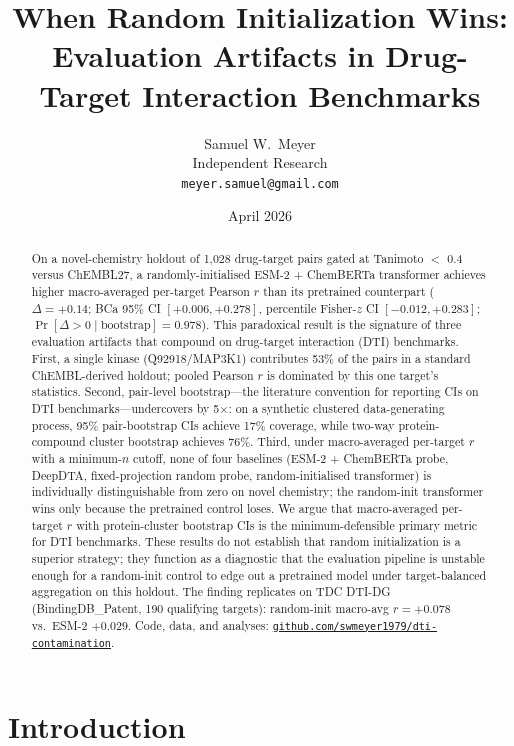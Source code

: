 \documentclass[11pt,a4paper]{article}
\title{\textbf{When Random Initialization Wins:\\
Evaluation Artifacts in Drug-Target Interaction Benchmarks}}
\author{
  Samuel W.\ Meyer\\
  Independent Research\\
  \texttt{meyer.samuel@gmail.com}
}
\date{April 2026}
\begin{document}
\maketitle

\begin{abstract}
On a novel-chemistry holdout of 1{,}028 drug-target pairs gated at Tanimoto $<$ 0.4
versus ChEMBL27, a randomly-initialised ESM-2 + ChemBERTa transformer achieves
higher macro-averaged per-target Pearson $r$ than its pretrained counterpart
($\Delta = +0.14$; BCa 95\% CI $[+0.006, +0.278]$, percentile Fisher-$z$
CI $[-0.012, +0.283]$;
$\Pr[\Delta > 0 \mid \text{bootstrap}] = 0.978$).
This paradoxical result is the signature of three evaluation artifacts that
compound on drug-target interaction (DTI) benchmarks.
First, a single kinase (Q92918/MAP3K1) contributes 53\% of the pairs in a
standard ChEMBL-derived holdout; pooled Pearson $r$ is dominated by this one
target's statistics.
Second, pair-level bootstrap---the literature convention for reporting CIs on DTI
benchmarks---undercovers by 5$\times$: on a synthetic clustered data-generating
process, 95\% pair-bootstrap CIs achieve 17\% coverage, while two-way
protein-compound cluster bootstrap achieves 76\%.
Third, under macro-averaged per-target $r$ with a minimum-$n$ cutoff, none of
four baselines (ESM-2 + ChemBERTa probe, DeepDTA, fixed-projection random probe,
random-initialised transformer) is individually distinguishable from zero on
novel chemistry; the random-init transformer wins only because the pretrained
control loses.
We argue that macro-averaged per-target $r$ with protein-cluster bootstrap CIs
is the minimum-defensible primary metric for DTI benchmarks.
These results do not establish that random initialization is a superior
strategy; they function as a diagnostic that the evaluation pipeline is
unstable enough for a random-init control to edge out a pretrained model
under target-balanced aggregation on this holdout.
The finding replicates on TDC DTI-DG (BindingDB\_Patent, 190 qualifying
targets): random-init macro-avg $r = +0.078$ vs.\ ESM-2 $+0.029$.
Code, data, and analyses: \href{https://github.com/swmeyer1979/dti-contamination}{\texttt{github.com/swmeyer1979/dti-contamination}}.
\end{abstract}

\section{Introduction}
\end{document}
